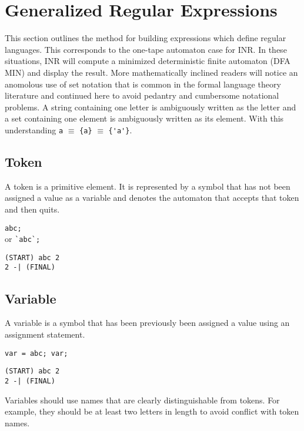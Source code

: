 \section{Generalized Regular Expressions}
This section outlines the method for building expressions which define
regular languages.
This corresponds to the one-tape automaton case for INR.
In these situations, INR will compute a minimized deterministic finite
automaton (DFA MIN) and display the result.
More mathematically inclined readers will notice an anomolous use of set
notation that is common in the formal language theory literature and
continued here to avoid pedantry and cumbersome notational problems.
A string containing one letter is ambiguously written as the letter and a
set containing one element is ambiguously written as its element.
With this understanding \verb#a# $\equiv$ \verb#{a}# $\equiv$ \verb#{'a'}#.

\subsection{Token}
A token is a primitive element.
It is represented by a symbol that has not been assigned a value as a
variable and denotes the automaton that accepts that token and then quits.
\begin{center}\begin{minipage}[t]{3in}\begin{minipage}[t]{3in}\begin{tabbing}
\qquad \= \verb#abc;#\\
or \> \verb#`abc`;#
\end{tabbing}\end{minipage}\end{minipage}
\begin{minipage}[t]{1.6in}\begin{verbatim}
(START) abc 2
2 -| (FINAL)
\end{verbatim}\end{minipage}\end{center}

\subsection{Variable}
A variable is a symbol that has been previously been assigned a value using
an assignment statement.
\begin{center}\begin{minipage}[t]{3in}\begin{minipage}[t]{3in}\begin{tabbing}
\qquad \= \verb#var = abc; var;#
\end{tabbing}\end{minipage}\end{minipage}
\begin{minipage}[t]{1.6in}\begin{verbatim}
(START) abc 2
2 -| (FINAL)
\end{verbatim}\end{minipage}\end{center}
Variables should use names that are clearly distinguishable from tokens.
For example, they should be at least two letters in length to avoid
conflict with token names.


